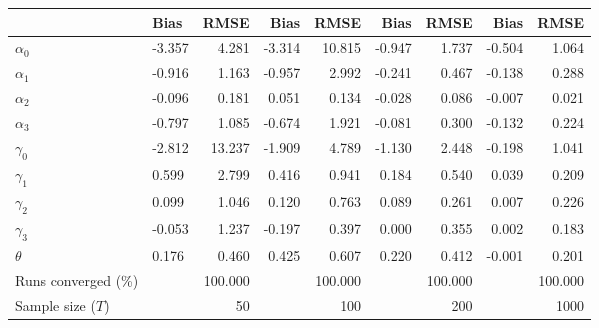 
\begin{tabular}[t]{llrrrrrrr}
\toprule
  & Bias & RMSE & Bias & RMSE & Bias & RMSE & Bias & RMSE\\
\midrule
$\alpha_{0}$ & -3.357 & 4.281 & -3.314 & 10.815 & -0.947 & 1.737 & -0.504 & 1.064\\
$\alpha_{1}$ & -0.916 & 1.163 & -0.957 & 2.992 & -0.241 & 0.467 & -0.138 & 0.288\\
$\alpha_{2}$ & -0.096 & 0.181 & 0.051 & 0.134 & -0.028 & 0.086 & -0.007 & 0.021\\
$\alpha_{3}$ & -0.797 & 1.085 & -0.674 & 1.921 & -0.081 & 0.300 & -0.132 & 0.224\\
$\gamma_{0}$ & -2.812 & 13.237 & -1.909 & 4.789 & -1.130 & 2.448 & -0.198 & 1.041\\
$\gamma_{1}$ & 0.599 & 2.799 & 0.416 & 0.941 & 0.184 & 0.540 & 0.039 & 0.209\\
$\gamma_{2}$ & 0.099 & 1.046 & 0.120 & 0.763 & 0.089 & 0.261 & 0.007 & 0.226\\
$\gamma_{3}$ & -0.053 & 1.237 & -0.197 & 0.397 & 0.000 & 0.355 & 0.002 & 0.183\\
$\theta$ & 0.176 & 0.460 & 0.425 & 0.607 & 0.220 & 0.412 & -0.001 & 0.201\\
Runs converged (\%) &  & 100.000 &  & 100.000 &  & 100.000 &  & 100.000\\
Sample size ($T$) &  & 50 &  & 100 &  & 200 &  & 1000\\
\bottomrule
\end{tabular}

